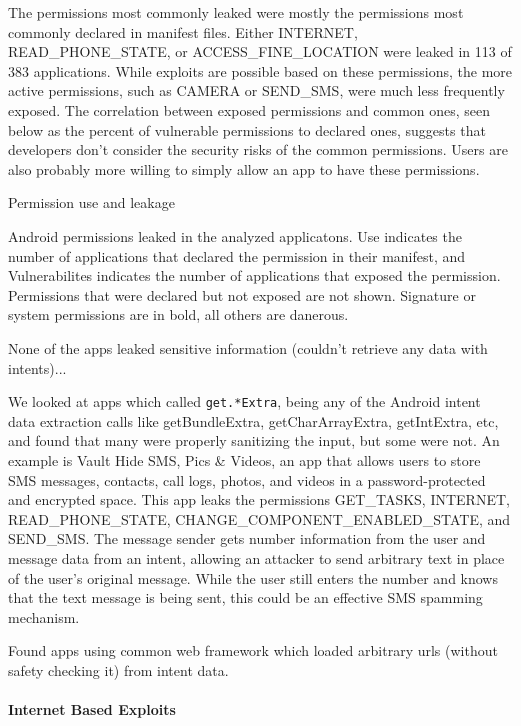 \documentclass[12pt,a4paper]{article}
\begin{document}
The permissions most commonly leaked were mostly the permissions most commonly
declared in manifest files. Either INTERNET, READ\_PHONE\_STATE, or
ACCESS\_FINE\_LOCATION were leaked in 113 of 383 applications. While exploits
are possible based on these permissions, the more active permissions, such as
CAMERA or SEND\_SMS, were much less frequently exposed. The correlation between
exposed permissions and common ones, seen below as the percent of vulnerable
permissions to declared ones, suggests that developers don't consider the
security risks of the common permissions. Users are also probably more willing
to simply allow an app to have these permissions.
\begin{table}
\caption{Permission use and leakage}

\caption*{Android permissions leaked in the analyzed applicatons. Use indicates
  the number of applications that declared the permission in their
  manifest, and Vulnerabilites indicates the number of applications that
  exposed the permission.  Permissions that were declared but not exposed
  are not shown. Signature or system permissions are in bold, all others
  are danerous.}
\end{table}
None of the apps leaked sensitive information (couldn't retrieve any data with
intents)...

We looked at apps which called \texttt{get.*Extra}, being any of the Android
intent data extraction calls like getBundleExtra, getCharArrayExtra,
getIntExtra, etc, and found that many were properly sanitizing the input, but
some were not. An example is Vault Hide SMS, Pics \& Videos, an app that allows
users to store SMS messages, contacts, call logs, photos, and videos in a
password-protected and encrypted space. This app leaks the permissions
GET\_TASKS, INTERNET, READ\_PHONE\_STATE, CHANGE\_COMPONENT\_ENABLED\_STATE, and
SEND\_SMS. The message sender gets number information from the user and message
data from an intent, allowing an attacker to send arbitrary text in place of the
user's original message. While the user still enters the number and knows that
the text message is being sent, this could be an effective SMS spamming
mechanism.

Found apps using common web framework which loaded arbitrary urls (without
safety checking it) from intent data.

\paragraph{Internet Based Exploits} ~\\
\end{document}
